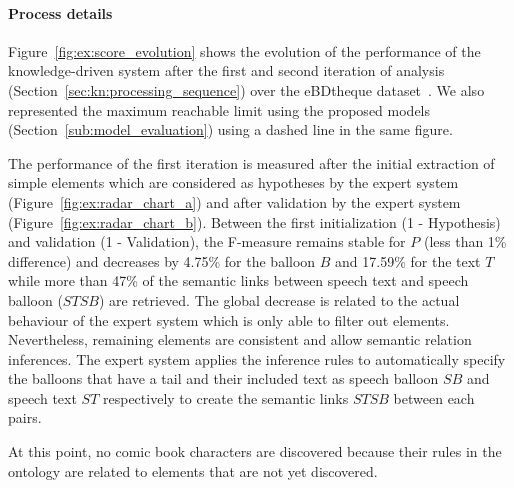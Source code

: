 

\paragraph{Process details} %
\label{par:process_details}

Figure~\ref{fig:ex:score_evolution} shows the evolution of the performance of the knowledge-driven system after the first and second iteration of analysis (Section~\ref{sec:kn:processing_sequence}) over the eBDtheque dataset~\cite{Guerin2013}.
We also represented the maximum reachable limit using the proposed models (Section~\ref{sub:model_evaluation}) using a  dashed line in the same figure.


The performance of the first iteration is measured after the initial extraction of simple elements which are considered as hypotheses by the expert system (Figure~\ref{fig:ex:radar_chart_a}) and after validation by the expert system (Figure~\ref{fig:ex:radar_chart_b}).
Between the first initialization (1 - Hypothesis) and validation (1 - Validation), the F-measure remains stable for $P$ (less than 1\% difference) and decreases by 4.75\% for the balloon $B$ and 17.59\% for the text $T$ while more than 47\% of the semantic links between speech text and speech balloon ($STSB$) are retrieved.
The global decrease is related to the actual behaviour of the expert system which is only able to filter out elements.
Nevertheless, remaining elements are consistent and allow semantic relation inferences.
The expert system applies the inference rules to automatically specify the balloons that have a tail and their included text as speech balloon $SB$ and speech text $ST$ respectively to create the semantic links $STSB$ between each pairs.

At this point, no comic book characters are discovered because their rules in the ontology are related to elements that are not yet discovered.

